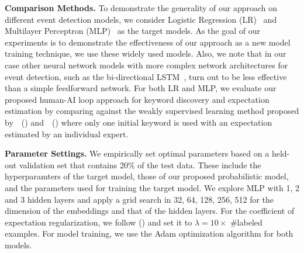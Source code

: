 \documentclass[letterpaper]{article}
\begin{document}
\smallskip
\noindent\textbf{Comparison Methods.} To demonstrate the generality of our approach on different event detection models, we consider Logistic Regression (LR)~\cite{ritter2015weakly} and Multilayer Perceptron (MLP)~\cite{chambers2018detecting} %
as the target models. As the goal of our experiments is to demonstrate the effectiveness of our approach as a new model training technique, we use these widely used models. Also, we note that in our case other neural network models with more complex network architectures for event detection, such as the bi-directional LSTM~\cite{chang2016expectation}, turn out to be less effective than a simple feedforward network. For both LR and MLP, we evaluate our proposed human-AI loop approach for keyword discovery and expectation estimation by comparing against the weakly supervised learning method proposed by~\citeauthor{ritter2015weakly}~(\citeyear{ritter2015weakly}) and~\citeauthor{chang2016expectation}~(\citeyear{chang2016expectation}) where only one initial keyword is used with an expectation estimated by an individual expert.

\smallskip
\noindent\textbf{Parameter Settings.} We empirically set optimal parameters based on a held-out validation set that contains 20\% of the test data. These include the hyperparamters of the target model, those of our proposed probabilistic model, and the parameters used for training the target model. We explore MLP with 1, 2 and 3 hidden layers and apply a grid search in {32, 64, 128, 256, 512} for the dimension of the embeddings and that of the hidden layers. %
For the coefficient of expectation regularization, we follow \citeauthor{mann2007simple} (\citeyear{mann2007simple}) and set it to $\lambda=10 \times$ \#labeled examples. %
For model training, we use the Adam \cite{kingma2014adam} optimization algorithm for both models.


\end{document}
